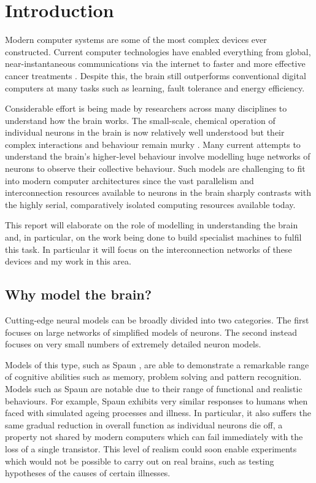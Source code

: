 \chapter{Introduction}
	
	Modern computer systems are some of the most complex devices ever constructed.
	Current computer technologies have enabled everything from global,
	near-instantaneous communications via the internet to faster and more
	effective cancer treatments \cite{nassif}. Despite this, the brain still
	outperforms conventional digital computers at many tasks such as learning,
	fault tolerance and energy efficiency.
	
	Considerable effort is being made by researchers across many disciplines to
	understand how the brain works. The small-scale, chemical operation of
	individual neurons in the brain is now relatively well understood but their
	complex interactions and behaviour remain murky \cite{dayan03}. Many current
	attempts to understand the brain's higher-level behaviour involve modelling
	huge networks of neurons to observe their collective behaviour.  Such models
	are challenging to fit into modern computer architectures since the vast
	parallelism and interconnection resources available to neurons in the brain
	sharply contrasts with the highly serial, comparatively isolated computing
	resources available today.
	
	This report will elaborate on the role of modelling in understanding the brain
	and, in particular, on the work being done to build specialist machines to
	fulfil this task. In particular it will focus on the interconnection networks
	of these devices and my work in this area.
	
	\section{Why model the brain?}
	
		Cutting-edge neural models can be broadly divided into two categories. The
		first focuses on large networks of simplified models of neurons.  The second
		instead focuses on very small numbers of extremely detailed neuron models.
		
		Models of this type, such as Spaun \cite{eliasmith12}, are able to
		demonstrate a remarkable range of cognitive abilities such as memory,
		problem solving and pattern recognition. Models such as Spaun are notable
		due to their range of functional and realistic behaviours. For example,
		Spaun exhibits very similar responses to humans when faced with simulated
		ageing processes and illness. In particular, it also suffers the same
		gradual reduction in overall function as individual neurons die off, a
		property not shared by modern computers which can fail immediately with the
		loss of a single transistor. This level of realism could soon enable
		experiments which would not be possible to carry out on real brains, such as
		testing hypotheses of the causes of certain illnesses.
		

